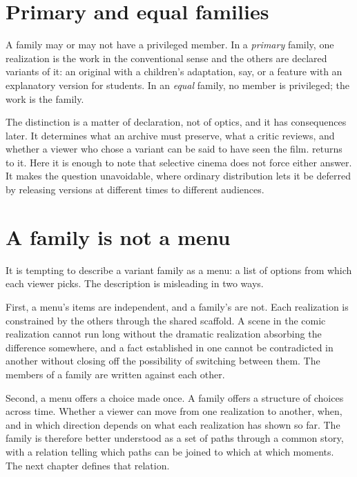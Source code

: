 \section{Primary and equal families}

A family may or may not have a privileged member. In a \emph{primary} family, one realization is the work in the conventional sense and the others are declared variants of it: an original with a children's adaptation, say, or a feature with an explanatory version for students. In an \emph{equal} family, no member is privileged; the work is the family.

The distinction is a matter of declaration, not of optics, and it has consequences later. It determines what an archive must preserve, what a critic reviews, and whether a viewer who chose a variant can be said to have seen the film.  returns to it. Here it is enough to note that selective cinema does not force either answer. It makes the question unavoidable, where ordinary distribution lets it be deferred by releasing versions at different times to different audiences.

\section{A family is not a menu}

It is tempting to describe a variant family as a menu: a list of options from which each viewer picks. The description is misleading in two ways.

First, a menu's items are independent, and a family's are not. Each realization is constrained by the others through the shared scaffold. A scene in the comic realization cannot run long without the dramatic realization absorbing the difference somewhere, and a fact established in one cannot be contradicted in another without closing off the possibility of switching between them. The members of a family are written against each other.

Second, a menu offers a choice made once. A family offers a structure of choices across time. Whether a viewer can move from one realization to another, when, and in which direction depends on what each realization has shown so far. The family is therefore better understood as a set of paths through a common story, with a relation telling which paths can be joined to which at which moments. The next chapter defines that relation.
